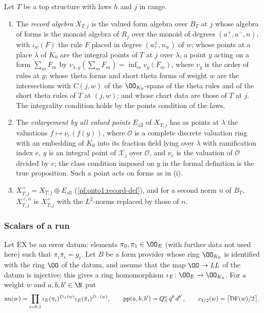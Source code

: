 \begin{definition}\label{pf:onto3:recpj}
Let $T$ be a top structure with laws $h$ and $j$ in range.
\begin{enumerate}[label=(\roman*)]
\item The \emph{record algebra} $X_{T,j}$ is the valued form algebra over $B_T$ at $j$ whose algebra of forms is the
monoid algebra of $R_j$ over the monoid of degrees $(a^+,a^-,n)$, with $\iota_w(F)$ the rule $F$ placed in degree
$(a^\pm_\tau,n_w)$ of $w$; whose points at a place $\lambda$ of $K_0$ are the integral points of $T$ at $j$ over
$\lambda$, a point $y$ acting on a form $\sum_mF_m$ by $v_{\lambda,y}(\sum_mF_m)=\inf_mv_y(F_m)$, where $v_y$ is the
order of rules at $y$; whose theta forms and short theta forms of weight $w$ are the intersections with $C(j,w)$ of
the $\OO_{K_0}$-spans of the theta rules and of the short theta rules of $T$ at $(j,w)$; and whose chart data are those
of $T$ at $j$.
The integrality condition holds by the points condition of the laws.
\item The \emph{enlargement by all valued points} $E_{\mathrm{all}}$ of $X_{T,j}$ has as points at $\lambda$ the
valuations $f\mapsto\nu_e(f(y))$, where $\mathcal O$ is a complete discrete valuation ring with an embedding of
$K_0$ into its fraction field lying over $\lambda$ with ramification index $e$, $y$ is an integral point of
$\mathcal X_j$ over $\mathcal O$, and $\nu_e$ is the valuation of $\mathcal O$ divided by $e$; the class condition
imposed on $y$ in the formal definition is the true proposition. Such a point acts on forms as in (i).
\item $X^+_{T,j}=X_{T,j}\oplus E_{\mathrm{all}}$ (\cref{pf:onto1:record-def}), and for a second norm $n$ of $B_T$,
$X^{+,n}_{T,j}$ is $X^+_{T,j}$ with the $L^2$-norms replaced by those of $n$.
\end{enumerate}
\end{definition}

\subsubsection{Scalars of a run}

Let $\mathrm{EX}$ be an error datum: elements $\pi_0,\pi_1\in\OO_E$ (with further data not used here) such that
$\pi_i\bar\pi_i=g_i$. Let $B$ be a form provider whose ring $\OO_{K_0}$ is identified with the ring $\OO$ of the
datum, and assume that the map $\OO\to\mathit{LL}$ of the datum is injective; this gives a ring homomorphism
$\iota_E\colon\OO_E\to\OO_{K_0}$. For a weight $w$ and $a,b,b'\in\N$ put
\[
\mathrm{nn}(w)=\prod_{i=0,1}\iota_E(\pi_i)^{D_+(w)}\iota_E(\bar\pi_i)^{D_-(w)},\qquad
\mathrm{pp}(a,b,b')=Q_S^a\,q^b\,d^{b'},\qquad c_{1/2}(w)=\bigl\lceil\operatorname{DF}(w)/2\bigr\rceil .
\]


